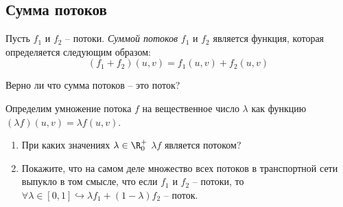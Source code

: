 \subsection{Сумма потоков}

\Def Пусть $f_1$ и $f_2$ -- потоки. \textit{Суммой потоков} $f_1$ и $f_2$ является функция, которая определяется следующим образом:
\begin{equation*}
    (f_1 + f_2) (u, v) = f_1(u, v) + f_2(u, v)
\end{equation*}

\Exe Верно ли что сумма потоков -- это поток?

\Exe Определим умножение потока $f$ на вещественное число $\lambda$ как функцию $(\lambda f)(u, v) = \lambda f(u, v)$.
\begin{enumerate}
    \item При каких значениях $\lambda \in \R^+_0$ $\lambda f$ является потоком?
    \item Покажите, что на самом деле множество всех потоков в транспортной сети выпукло в том смысле, что если $f_1$ и $f_2$ -- потоки, то $\forall \lambda \in [0, 1] \hookrightarrow \lambda f_1 + (1 - \lambda) f_2 \text{ -- поток.}$
\end{enumerate}


